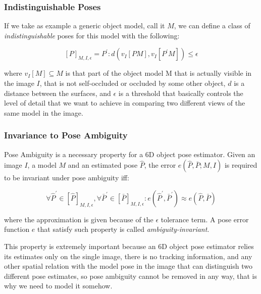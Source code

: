 \subsubsection{Indistinguishable Poses}\label{subsubsec:indistinguishable_poses}
If we take as example a generic object model, call it $M$, we can define a class of \emph{indistinguishable} poses for this model with the following:

\begin{equation}
    \label{eq:indistinguishable_poses}
    [P]_{M,I,\epsilon} = {P^{\prime} : d(v_I[PM], v_I[P^{\prime}M]) \leq \epsilon}
\end{equation}

where $v_I[M] \subseteq M$ is that part of the object model M that is actually visible in the image $I$, that is not self-occluded or occluded by some other object, $d$ is a distance between the surfaces, and $\epsilon$ is a threshold that basically controls the level of detail that we want to achieve in comparing two different views of the same model in the image.

\subsubsection{Invariance to Pose Ambiguity}\label{subsubsec:pose_ambiguity_invariance}
Pose Ambiguity is a necessary property for a 6D object pose estimator. Given an image $I$, a model $M$ and an estimated pose $\hat{P}$, the error $e(\hat{P}, \bar{P}; M, I)$ is required to be invariant under pose ambiguity iff:

\begin{equation}
    \label{eq:pose_ambiguity_invariance}
    \forall \hat{P}^\prime \in [\hat{P}]_{M, I, \epsilon},
    \forall \bar{P}^\prime \in [\bar{P}]_{M, I, \epsilon} : 
    e(\hat{P}^\prime, \bar{P}^\prime) \approx e(\hat{P}, \bar{P})
\end{equation}

where the approximation is given because of the $\epsilon$ tolerance term. A pose error function $e$ that satisfy such property is called \emph{ambiguity-invariant}.

This property is extremely important because an 6D object pose estimator relies its estimates only on the single image, there is no tracking information, and any other spatial relation with the model pose in the image that can distinguish two different pose estimates, so pose ambiguity cannot be removed in any way, that is why we need to model it somehow.

